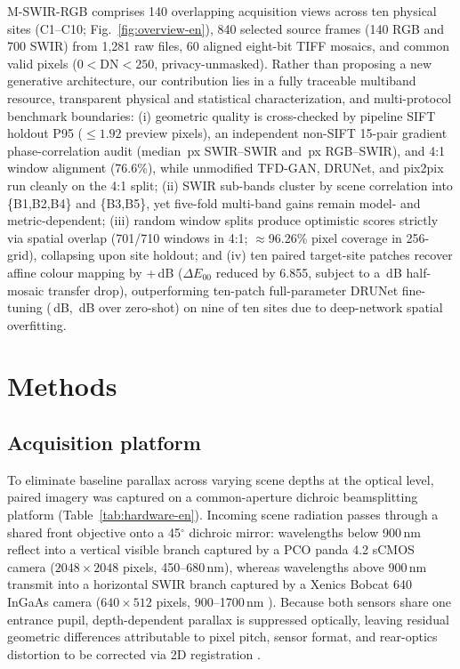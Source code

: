 \documentclass[a4paper,10pt]{article}
\newcommand{\dE}{\ensuremath{\Delta E_{00}}}
\begin{document}
M-SWIR-RGB comprises 140 overlapping acquisition views across ten physical sites (C1--C10; Fig.~\ref{fig:overview-en}), 840 selected source frames (140 RGB and 700 SWIR) from 1,281 raw files, 60 aligned eight-bit TIFF mosaics, and \SupportPixelCount{} common valid pixels ($0<\mathrm{DN}<250$, privacy-unmasked). Rather than proposing a new generative architecture, our contribution lies in a fully traceable multiband resource, transparent physical and statistical characterization, and multi-protocol benchmark boundaries: (i) geometric quality is cross-checked by pipeline SIFT holdout P95 ($\le 1.92$ preview pixels), an independent non-SIFT 15-pair gradient phase-correlation audit (median \AuditSwirSwirMed\,px SWIR--SWIR and \AuditRgbSwirMed\,px RGB--SWIR), and 4:1 window alignment (76.6\%), while unmodified TFD-GAN, DRUNet, and pix2pix run cleanly on the 4:1 split; (ii) SWIR sub-bands cluster by scene correlation into \{B1,B2,B4\} and \{B3,B5\}, yet five-fold multi-band gains remain model- and metric-dependent; (iii) random window splits produce optimistic scores strictly via spatial overlap (701/710 windows in 4:1; $\approx$96.26\% pixel coverage in 256-grid), collapsing upon site holdout; and (iv) ten paired target-site patches recover affine colour mapping by +\CalibrationAffineGain\,dB (\dE{} reduced by 6.855, subject to a \HalfDrop\,dB half-mosaic transfer drop), outperforming ten-patch full-parameter DRUNet fine-tuning (\TrackCDrFtPsnr\,dB, \TrackCDrFtGainZs\,dB over zero-shot) on nine of ten sites due to deep-network spatial overfitting.

\section{Methods}
\subsection{Acquisition platform}
To eliminate baseline parallax across varying scene depths at the optical level, paired imagery was captured on a common-aperture dichroic beamsplitting platform (Table~\ref{tab:hardware-en}). Incoming scene radiation passes through a shared front objective onto a 45$^{\circ}$ dichroic mirror: wavelengths below 900\,nm reflect into a vertical visible branch captured by a PCO panda 4.2 sCMOS camera ($2048\times2048$ pixels, 450--680\,nm), whereas wavelengths above 900\,nm transmit into a horizontal SWIR branch captured by a Xenics Bobcat 640 InGaAs camera ($640\times512$ pixels, 900--1700\,nm \cite{rogalski2003}). Because both sensors share one entrance pupil, depth-dependent parallax is suppressed optically, leaving residual geometric differences attributable to pixel pitch, sensor format, and rear-optics distortion to be corrected via 2D registration \cite{zitova2003}.
\end{document}
